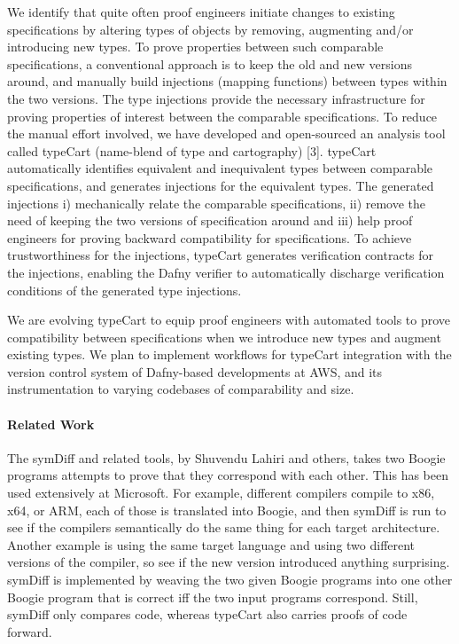 We identify that quite often proof engineers initiate changes to existing specifications by altering types of objects by removing, augmenting and/or introducing new types. To prove properties between such comparable specifications, a conventional approach is to keep the old and new versions around, and manually build injections (mapping functions) between types within the two versions. The type injections provide the necessary infrastructure for proving properties of interest between the comparable specifications. To reduce the manual effort involved, we have developed and open-sourced an analysis tool called typeCart (name-blend of type and cartography) [3]. typeCart automatically identifies equivalent and inequivalent types between comparable specifications, and generates injections for the equivalent types. The generated injections i) mechanically relate the comparable specifications, ii) remove the need of keeping the two versions of specification around and iii) help proof engineers for proving backward compatibility for specifications. To achieve trustworthiness for the injections, typeCart generates verification contracts for the injections, enabling the Dafny verifier to automatically discharge verification conditions of the generated type injections. 

We are evolving typeCart to equip proof engineers with automated tools to prove compatibility between specifications when we introduce new types and augment existing types. We plan to implement workflows for typeCart integration with the version control system of Dafny-based developments at AWS, and its instrumentation to varying codebases of comparability and size.



\paragraph{Related Work}
The symDiff and related tools, by Shuvendu Lahiri and others, takes two Boogie programs attempts to prove that they correspond with each other. This has been used extensively at Microsoft. For example, different compilers compile to x86, x64, or ARM, each of those is translated into Boogie, and then symDiff is run to see if the compilers semantically do the same thing for each target architecture. Another example is using the same target language and using two different versions of the compiler, so see if the new version introduced anything surprising. symDiff is implemented by weaving the two given Boogie programs into one other Boogie program that is correct iff the two input programs correspond.
Still, symDiff only compares code, whereas typeCart also carries proofs of code forward.

